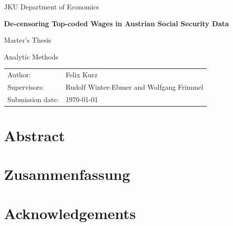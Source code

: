 \documentclass[12pt,a4paper,oneside,titlepage]{book}
\newif\ifthesisdraft
\newcommand{\draftnote}[1]{%
  \ifthesisdraft
    \par\noindent\colorbox{yellow!20}{%
      \parbox{0.94\textwidth}{\textbf{Draft note:} #1}%
    }\par
  \fi
}
\newcommand{\thesistitle}{De-censoring Top-coded Wages in Austrian Social Security Data}
\newcommand{\thesisauthor}{Felix Kurz}
\newcommand{\thesistype}{Master's Thesis}
\newcommand{\degreeprogramme}{Analytic Methods}
\newcommand{\university}{JKU Department of Economics}
\newcommand{\supervisors}{Rudolf Winter-Ebmer and Wolfgang Frimmel}
\newcommand{\submissiondate}{\today}
\begin{document}
\frontmatter

\begin{titlepage}
  \centering
  \vspace*{18mm}

  {\Large \university\par}
  \vspace{24mm}

  {\Huge\bfseries \thesistitle\par}
  \vspace{16mm}

  {\Large \thesistype\par}
  \vspace{6mm}

  {\large \degreeprogramme\par}

  \vfill

  \begin{tabular}{@{}ll@{}}
    Author: & \thesisauthor \\
    Supervisors: & \supervisors \\
    Submission date: & \submissiondate
  \end{tabular}

  \vspace*{12mm}
\end{titlepage}

\chapter*{Abstract}
\draftnote{Write a concise summary of the motivation, data, empirical strategy, main results, and contribution. Add keywords at the end.}

\chapter*{Zusammenfassung}
\draftnote{Add the German-language abstract if required by the degree programme. Remove this page if it is not required.}

\chapter*{Acknowledgements}
\draftnote{Optional. Remove this page if no acknowledgements are needed.}
\end{document}

